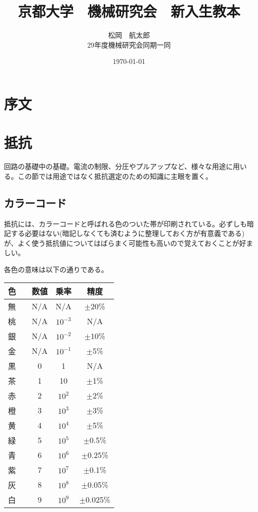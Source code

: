 \documentclass[a4paper,titlepage]{ujarticle}
\title{京都大学　機械研究会　新入生教本}
\date{\today}
\author{松岡　航太郎\\29年度機械研究会同期一同}
\begin{document}
\maketitle
\section{序文}
\section{抵抗}
回路の基礎中の基礎。電流の制限、分圧やプルアップなど、様々な用途に用いる。この節では用途ではなく抵抗選定のための知識に主眼を置く。
\subsection{カラーコード}
抵抗には、カラーコードと呼ばれる色のついた帯が印刷されている。必ずしも暗記する必要はない(暗記しなくても済むように整理しておく方が有意義である)が、よく使う抵抗値についてはばらまく可能性も高いので覚えておくことが好ましい。

各色の意味は以下の通りである。

\begin{table}[H]
	\begin{tabular}{|cc|c|c|c|}\hline
		色&&数値&乗率&精度\\ \hline
		無&&N/A&N/A&$\pm$20\%\\ \hline
		桃&\cellcolor[rgb]{1,0.412,0.706}{　}&N/A&$10^{-3}$&N/A\\ \hline
		銀&\cellcolor[rgb]{0.753,0.753,0.753}{　}&N/A&$10^{-2}$&$\pm$10\%\\ \hline
		金&\cellcolor[rgb]{0.812,0.71,0.231}{　}&N/A&$10^{-1}$&$\pm$5\%\\ \hline
		黒&\cellcolor{black}{　}&0&1&N/A\\ \hline
		茶&\cellcolor[rgb]{0.647059,0.164706,0.164706}{　}&1&10&$\pm$1\%\\ \hline
		赤&\cellcolor{red}{　}&2&$10^2$&$\pm$2\%\\ \hline
		橙&\cellcolor[rgb]{0.894118,0.368627,0}{　}&3&$10^3$&$\pm$3\% \\ \hline
		黄&\cellcolor{yellow}{　}&4&$10^4$&$\pm$5\%\\ \hline
		緑&\cellcolor{green}{　}&5&$10^5$&$\pm$0.5\%\\ \hline
		青&\cellcolor{blue}{　}&6&$10^6$&$\pm$0.25\%\\ \hline
		紫&\cellcolor[rgb]{0.58,0,0.827}{　}&7&$10^7$&$\pm$0.1\%\\ \hline
		灰&\cellcolor[rgb]{0.627,0.627,0.627}{　}&8&$10^8$&$\pm$0.05\%\\ \hline
		白&\cellcolor[rgb]{1,1,1}{　}&9&$10^9$&$\pm$0.025\%\\ \hline
	\end{tabular}
\end{table}
\end{document}
